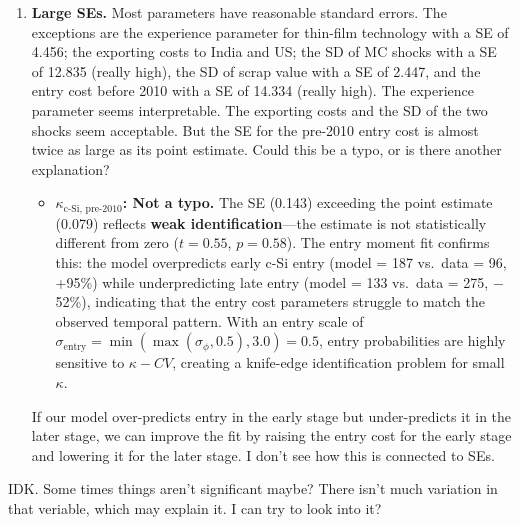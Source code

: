 \documentclass[12pt]{article}
\begin{document}
\begin{enumerate}
{  Sure. Will run the new specification soon as I can.
 
 }

    \item \textbf{Large SEs.} Most parameters have reasonable standard errors. The exceptions are the experience parameter for thin-film technology with a SE of 4.456; the exporting costs to India and US; the SD of MC shocks with a SE of 12.835 (really high), the SD of scrap value with a SE of 2.447, and the entry cost before 2010 with a SE of 14.334 (really high). The experience parameter seems interpretable. The exporting costs and the SD of the two shocks seem acceptable. But the SE for the pre-2010 entry cost is almost twice as large as its point estimate. Could this be a typo, or is there another explanation?
    
    {\color{answerblue}

    \begin{itemize}[leftmargin=2em]
        \item \textbf{$\kappa_{\text{c-Si, pre-2010}}$: Not a typo.} The SE (0.143) exceeding the point estimate (0.079) reflects \textbf{weak identification}---the estimate is not statistically different from zero ($t = 0.55$, $p = 0.58$). The entry moment fit confirms this: the model overpredicts early c-Si entry (model = 187 vs.\ data = 96, +95\%) while underpredicting late entry (model = 133 vs.\ data = 275, $-$52\%), indicating that the entry cost parameters struggle to match the observed temporal pattern. With an entry scale of $\sigma_{\text{entry}} = \min(\max(\sigma_\phi, 0.5), 3.0) = 0.5$, entry probabilities are highly sensitive to $\kappa - CV$, creating a knife-edge identification problem for small $\kappa$.



    \end{itemize}
    }
     {\color{red} If our model over-predicts entry in the early stage but under-predicts it in the later stage, we can improve the fit by raising the entry cost for the early stage and lowering it for the later stage. I don’t see how this is connected to SEs.
     }
\end{enumerate}

{\color{answerblue}
IDK. Some times things aren't significant maybe? There isn't much variation in that veriable, which may explain it. I can try to look into it?
}
\end{document}
